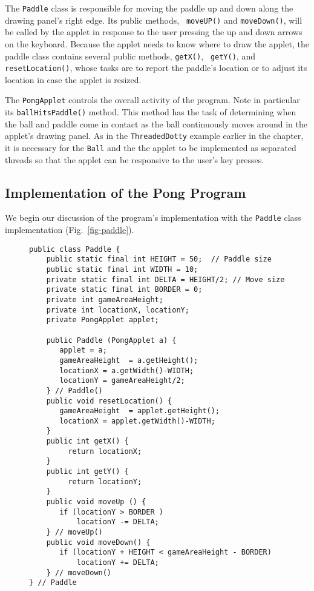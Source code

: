 The {\tt Paddle} class is responsible for moving the paddle up and
down along the drawing panel's right edge. Its public methods, {\tt
moveUP()} and {\tt moveDown()},  will be called by the applet in
response to the user pressing the up and down arrows on the
keyboard.  Because the applet needs to know where to draw the applet,
the paddle class contains several public methods, {\tt getX()}, {\tt
getY()}, and {\tt resetLocation()}, whose tasks are to report the
paddle's location or to adjust its location in case the applet
is resized.

The {\tt PongApplet} controls the overall activity of the program.
Note in particular its {\tt ballHitsPaddle()} method. This method has
the task of determining when the ball and paddle come in contact as
the ball continuously moves around in the applet's drawing panel.  As
in the {\tt ThreadedDotty} example earlier in the chapter, it is
necessary for the {\tt Ball} and the the applet to be implemented as
separated threads so that the applet can be responsive to the user's
key presses.

\subsection{Implementation of the Pong Program}

We begin our discussion of the program's implementation with the {\tt Paddle} class
implementation (Fig.~\ref{fig-paddle}).
\begin{figure}[htb]
\jjjprogstart
\begin{jjjlisting}[27pc]
\begin{lstlisting}
public class Paddle {
    public static final int HEIGHT = 50;  // Paddle size
    public static final int WIDTH = 10;       
    private static final int DELTA = HEIGHT/2; // Move size
    private static final int BORDER = 0;
    private int gameAreaHeight;
    private int locationX, locationY;
    private PongApplet applet;

    public Paddle (PongApplet a) {
       applet = a;
       gameAreaHeight  = a.getHeight();
       locationX = a.getWidth()-WIDTH;
       locationY = gameAreaHeight/2;
    } // Paddle()
    public void resetLocation() {
       gameAreaHeight  = applet.getHeight();
       locationX = applet.getWidth()-WIDTH;
    }
    public int getX() {
         return locationX;
    }
    public int getY() {
         return locationY;
    }
    public void moveUp () {
       if (locationY > BORDER )
           locationY -= DELTA;
    } // moveUp()
    public void moveDown() {
       if (locationY + HEIGHT < gameAreaHeight - BORDER)
           locationY += DELTA;
    } // moveDown()
} // Paddle
\end{lstlisting}
\end{jjjlisting}
\end{figure}

